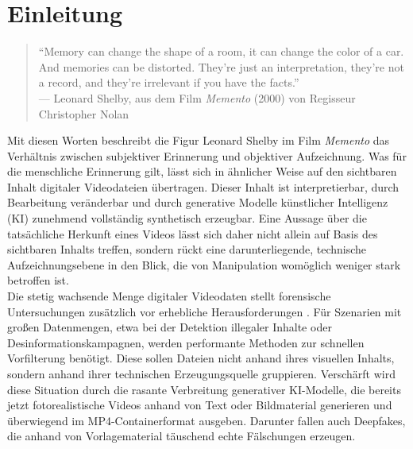 \chapter{Einleitung}

\begin{quote}
    \enquote{Memory can change the shape of a room, it can change the color of a car. And memories can be distorted. They're just an interpretation, they're not a record, and they're irrelevant if you have the facts.}
    \\[0.3em]
    \hfill --- Leonard Shelby, aus dem Film \textit{Memento} (2000) von Regisseur Christopher Nolan
\end{quote}\vspace{7cm}


\label{sec:motivation}
Mit diesen Worten beschreibt die Figur Leonard Shelby im Film \textit{Memento} \cite{nolan_memento_2000} das Verhältnis zwischen subjektiver Erinnerung und objektiver Aufzeichnung. Was für die menschliche Erinnerung gilt, lässt sich in ähnlicher Weise auf den sichtbaren Inhalt digitaler Videodateien übertragen. Dieser Inhalt ist interpretierbar, durch Bearbeitung veränderbar und durch generative Modelle künstlicher Intelligenz (KI) zunehmend vollständig synthetisch erzeugbar. Eine Aussage über die tatsächliche Herkunft eines Videos lässt sich daher nicht allein auf Basis des sichtbaren Inhalts treffen, sondern rückt eine darunterliegende, technische Aufzeichnungsebene in den Blick, die von Manipulation womöglich weniger stark betroffen ist.\\

Die stetig wachsende Menge digitaler Videodaten stellt forensische Untersuchungen zusätzlich vor erhebliche Herausforderungen \cite{europol_common_2024}. Für Szenarien mit großen Datenmengen, etwa bei der Detektion illegaler Inhalte oder Desinformationskampagnen, werden performante Methoden zur schnellen Vorfilterung benötigt. Diese sollen Dateien nicht anhand ihres visuellen Inhalts, sondern anhand ihrer technischen Erzeugungsquelle gruppieren. Verschärft wird diese Situation durch die rasante Verbreitung generativer KI-Modelle, die bereits jetzt fotorealistische Videos anhand von Text oder Bildmaterial generieren und überwiegend im MP4-Containerformat ausgeben. Darunter fallen auch Deepfakes, die anhand von Vorlagematerial täuschend echte Fälschungen erzeugen.

